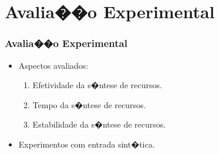 \documentclass[compress]{beamer}
\begin{document}

\section[\thesection]{Avalia��o Experimental}
\frame
{
 \frametitle{Avalia��o Experimental}
 \begin{itemize}
  \item Aspectos avaliados:
  \begin{enumerate}
   \item Efetividade da s�ntese de recursos.
   \item Tempo da s�ntese de recursos.
   \item Estabilidade da s�ntese de recursos.
  \end{enumerate}
  \item Experimentos com entrada sint�tica.
 \end{itemize}
}
\end{document}
